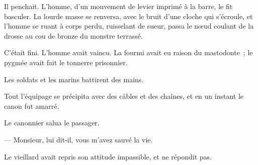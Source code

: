 \documentclass[french,twoside]{book} %
\begin{document}
Il penchait. L’homme, d’un mouvement de levier  imprimé à la barre, le fit basculer. La lourde masse se renversa, avec le bruit d’une cloche qui s’écroule, et l’homme se ruant à corps perdu, ruisselant de sueur, passa le nœud coulant de la drosse au cou de bronze du monstre terrassé.\par
C’était fini. L’homme avait vaincu. La fourmi avait eu raison du mastodonte ; le pygmée avait fait le tonnerre prisonnier.\par
Les soldats et les marins battirent des mains.\par
Tout l’équipage se précipita avec des câbles et des chaînes, et en un instant le canon fut amarré.\par
Le canonnier salua le passager.\par
— Monsieur, lui dit-il, vous m’avez sauvé la vie.\par
Le vieillard avait repris son attitude impassible, et ne répondit pas.
\end{document}
